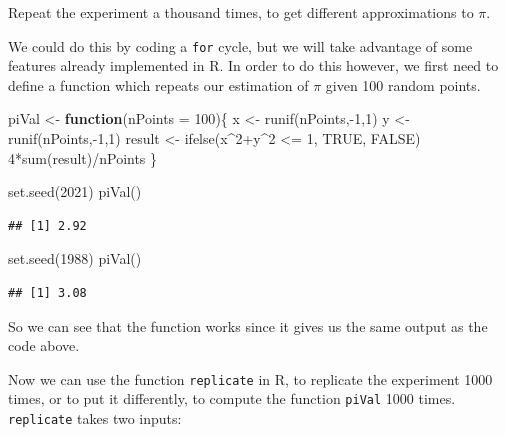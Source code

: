 \documentclass[
]{book}
\newenvironment{Shaded}{\begin{snugshade}}{\end{snugshade}}
\newcommand{\AttributeTok}[1]{\textcolor[rgb]{0.77,0.63,0.00}{#1}}
\newcommand{\ConstantTok}[1]{\textcolor[rgb]{0.00,0.00,0.00}{#1}}
\newcommand{\ControlFlowTok}[1]{\textcolor[rgb]{0.13,0.29,0.53}{\textbf{#1}}}
\newcommand{\DecValTok}[1]{\textcolor[rgb]{0.00,0.00,0.81}{#1}}
\newcommand{\FunctionTok}[1]{\textcolor[rgb]{0.00,0.00,0.00}{#1}}
\newcommand{\NormalTok}[1]{#1}
\newcommand{\OtherTok}[1]{\textcolor[rgb]{0.56,0.35,0.01}{#1}}
\newcommand{\SpecialCharTok}[1]{\textcolor[rgb]{0.00,0.00,0.00}{#1}}
\theoremstyle{definition}
\theoremstyle{definition}
\theoremstyle{definition}
\theoremstyle{definition}
\theoremstyle{remark}
\begin{document}
Repeat the experiment a thousand times, to get different approximations to \(\pi\).

We could do this by coding a \texttt{for} cycle, but we will take advantage of some features already implemented in R. In order to do this however, we first need to define a function which repeats our estimation of \(\pi\) given 100 random points.

\begin{Shaded}
\begin{Highlighting}[]
\NormalTok{piVal }\OtherTok{\textless{}{-}} \ControlFlowTok{function}\NormalTok{(}\AttributeTok{nPoints =} \DecValTok{100}\NormalTok{)\{}
\NormalTok{  x }\OtherTok{\textless{}{-}} \FunctionTok{runif}\NormalTok{(nPoints,}\SpecialCharTok{{-}}\DecValTok{1}\NormalTok{,}\DecValTok{1}\NormalTok{)}
\NormalTok{  y }\OtherTok{\textless{}{-}} \FunctionTok{runif}\NormalTok{(nPoints,}\SpecialCharTok{{-}}\DecValTok{1}\NormalTok{,}\DecValTok{1}\NormalTok{)}
\NormalTok{  result }\OtherTok{\textless{}{-}} \FunctionTok{ifelse}\NormalTok{(x}\SpecialCharTok{\^{}}\DecValTok{2}\SpecialCharTok{+}\NormalTok{y}\SpecialCharTok{\^{}}\DecValTok{2} \SpecialCharTok{\textless{}=} \DecValTok{1}\NormalTok{, }\ConstantTok{TRUE}\NormalTok{, }\ConstantTok{FALSE}\NormalTok{)}
  \DecValTok{4}\SpecialCharTok{*}\FunctionTok{sum}\NormalTok{(result)}\SpecialCharTok{/}\NormalTok{nPoints}
\NormalTok{\}}

\FunctionTok{set.seed}\NormalTok{(}\DecValTok{2021}\NormalTok{)}
\FunctionTok{piVal}\NormalTok{()}
\end{Highlighting}
\end{Shaded}

\begin{verbatim}
## [1] 2.92
\end{verbatim}

\begin{Shaded}
\begin{Highlighting}[]
\FunctionTok{set.seed}\NormalTok{(}\DecValTok{1988}\NormalTok{)}
\FunctionTok{piVal}\NormalTok{()}
\end{Highlighting}
\end{Shaded}

\begin{verbatim}
## [1] 3.08
\end{verbatim}

So we can see that the function works since it gives us the same output as the code above.

Now we can use the function \texttt{replicate} in R, to replicate the experiment 1000 times, or to put it differently, to compute the function \texttt{piVal} 1000 times. \texttt{replicate} takes two inputs:
\end{document}
